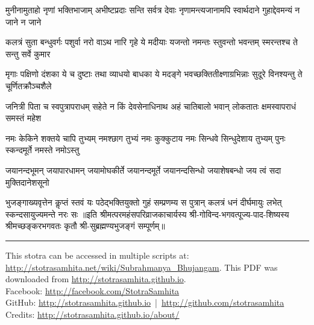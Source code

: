 \documentclass[a5paper,twoside,12pt]{book}
\begin{document}
\begin{center}
\fourlineindentedshloka
{मुनीनामुताहो नृणां भक्तिभाजाम्}
{अभीष्टप्रदाः सन्ति सर्वत्र देवाः}
{नृणामन्त्यजानामपि स्वार्थदाने}
{गुहाद्देवमन्यं न जाने न जाने}

\fourlineindentedshloka
{कलत्रं सुता बन्धुवर्गः पशुर्वा}
{नरो वाऽथ नारि गृहे ये मदीयाः}
{यजन्तो नमन्तः स्तुवन्तो भवन्तम्}
{स्मरन्तश्च ते सन्तु सर्वे कुमार}

\fourlineindentedshloka
{मृगाः पक्षिणो दंशका ये च दुष्टाः}
{तथा व्याधयो बाधका ये मदङ्गे}
{भवच्छक्तितीक्ष्णाग्रभिन्नाः सुदूरे}
{विनश्यन्तु ते चूर्णितक्रौञ्चशैले}

\fourlineindentedshloka
{जनित्री पिता च स्वपुत्रापराधम्}
{सहेते न किं देवसेनाधिनाथ}
{अहं चातिबालो भवान् लोकतातः}
{क्षमस्वापराधं समस्तं महेश}

\fourlineindentedshloka
{नमः केकिने शक्तये चापि तुभ्यम्}
{नमश्छाग तुभ्यं नमः कुक्कुटाय}
{नमः सिन्धवे सिन्धुदेशाय तुभ्यम्}
{पुनः स्कन्दमूर्ते नमस्ते नमोऽस्तु}

\fourlineindentedshloka
{जयानन्दभूमन् जयापारधामन्}
{जयामोघकीर्ते जयानन्दमूर्ते}
{जयानन्दसिन्धो जयाशेषबन्धो}
{जय त्वं सदा मुक्तिदानेशसूनो}

\fourlineindentedshloka
{भुजङ्गाख्यवृत्तेन कॢप्तं स्तवं यः}
{पठेद्भक्तियुक्तो गुहं सम्प्रणम्य}
{स पुत्रान् कलत्रं धनं दीर्घमायुः}
{लभेत् स्कन्दसायुज्यमन्ते नरः सः}
॥इति  श्रीमत्परमहंसपरिव्राजकाचार्यस्य श्री-गोविन्द-भगवत्पूज्य-पाद-शिष्यस्य 
श्रीमच्छङ्करभगवतः कृतौ श्री-सुब्रह्मण्यभुजङ्गं सम्पूर्णम्॥\end{center}
\vfill
\hrule
\footnotesize
{}
\textsf{This stotra can be accessed in multiple scripts at:\\
\url{http://stotrasamhita.net/wiki/Subrahmanya_Bhujangam}. This PDF was downloaded from \url{http://stotrasamhita.github.io}.\\[1ex]
Facebook: \url{http://facebook.com/StotraSamhita}\\[0.7ex]
GitHub: \url{http://stotrasamhita.github.io}~|~\url{http://github.com/stotrasamhita}\\[0.7ex]
Credits: \url{http://stotrasamhita.github.io/about/}}
\end{document}
